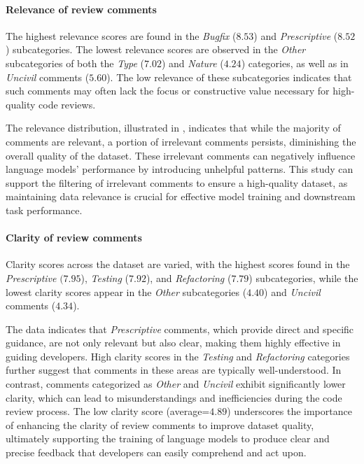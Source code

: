 \paragraph*{\textbf{Relevance of review comments}}
The highest relevance scores are found in the \emph{Bugfix} ($8.53$) and \emph{Prescriptive} ($8.52$) subcategories. The lowest relevance scores are observed in the \emph{Other} subcategories of both the \emph{Type} ($7.02$) and \emph{Nature} ($4.24$) categories, as well as in \emph{Uncivil} comments ($5.60$).
The low relevance of these subcategories indicates that such comments may often lack the focus or constructive value necessary for high-quality code reviews. 

The relevance distribution, illustrated in , indicates that while the majority of comments are relevant, a portion of irrelevant comments persists, diminishing the overall quality of the dataset. These irrelevant comments can negatively influence language models' performance by introducing unhelpful patterns. 
This study can support the filtering of irrelevant comments to ensure a high-quality dataset, as maintaining data relevance is crucial for effective model training and downstream task performance.


\paragraph*{\textbf{Clarity of review comments}}

Clarity scores across the dataset are varied, with the highest scores found in the \emph{Prescriptive} $(7.95$), \emph{Testing} ($7.92$), and \emph{Refactoring} ($7.79$) subcategories, while the lowest clarity scores appear in the \emph{Other} subcategories ($4.40$) and \emph{Uncivil} comments ($4.34$).

The data indicates that \emph{Prescriptive} comments, which provide direct and specific guidance, are not only relevant but also clear, making them highly effective in guiding developers. High clarity scores in the \emph{Testing} and \emph{Refactoring} categories further suggest that comments in these areas are typically well-understood. In contrast, comments categorized as \emph{Other} and \emph{Uncivil} exhibit significantly lower clarity, which can lead to misunderstandings and inefficiencies during the code review process. The low clarity score (average=$4.89$) underscores the importance of enhancing the clarity of review comments to improve dataset quality, ultimately supporting the training of language models to produce clear and precise feedback that developers can easily comprehend and act upon.


